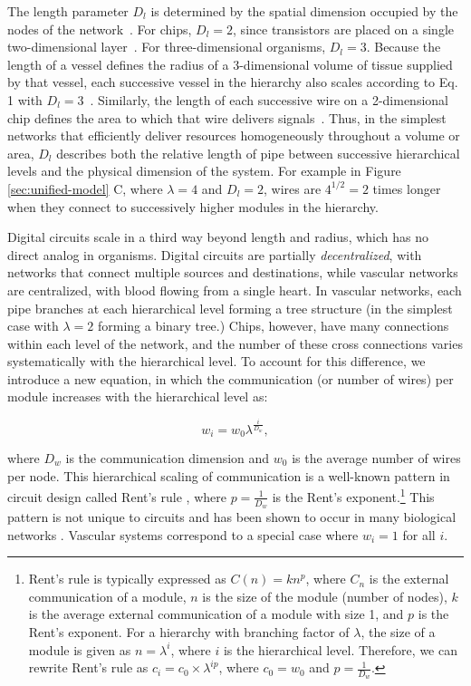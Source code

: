 \documentclass[12pt]{article}
\begin{document}
The length parameter $D_l$ is determined by the spatial dimension occupied by the
nodes of the network~\cite{mandelbrot83}.  For chips, $D_l = 2$, since
transistors are placed on a single two-dimensional layer~\cite{donath81}. For
three-dimensional organisms,  $D_l = 3$. Because the length of a
vessel defines the radius of a 3-dimensional volume of tissue supplied
by that vessel, each successive vessel in the hierarchy also scales
according to Eq. 1 with $D_l = 3$~\cite{west97, banavar10}. Similarly,
the length of each successive wire on a 2-dimensional chip defines the
area to which that wire delivers signals~\cite{moses08}. Thus, in the simplest networks that efficiently deliver resources homogeneously throughout a volume or area, $D_l$ describes both the relative length of pipe between successive hierarchical levels and the physical
dimension of the system. For example in Figure \ref{sec:unified-model} C, where $\lambda = 4$ and $D_l = 2$, wires are $4^{1/2} = 2$ times longer when they connect to successively higher modules in the hierarchy.

Digital circuits scale in a third way beyond length and radius, which
has no direct analog in organisms. Digital circuits are partially \emph{decentralized}, with networks that connect multiple sources and destinations, while vascular networks are
centralized, with blood flowing from a single heart. 
In vascular networks, each pipe
branches at each hierarchical level forming a tree structure
(in the simplest case with $\lambda = 2$ forming
a binary tree.) Chips, however, have many connections within each
level of the network, and the number of these cross connections
varies systematically with the hierarchical level.  
 To account for
this difference, we introduce a new equation, in which the
communication (or number of wires) per module increases with the
hierarchical level as:  

\begin{equation}
  w_i = w_0 \lambda^{\frac{i}{D_w}},
\label{eq:communication}
\end{equation}

\noindent where $D_w$ is the communication dimension and $w_0$ is the average
number of wires per node.  This hierarchical scaling of communication is a
well-known pattern in circuit design called Rent's rule \cite{christie00},
where $p = \frac{1}{D_w}$ is the Rent's exponent.\footnote{Rent's rule is typically
  expressed as $C(n) = kn^p$, where $C_n$ is the external communication of a
  module, $n$ is the size of the module (number of nodes), $k$ is the average
  external communication of a module with size 1, and $p$ is the Rent's
  exponent. For a hierarchy with branching factor of $\lambda$, the size of a
  module is given as $n = \lambda^i$, where $i$ is the hierarchical level.
  Therefore, we can rewrite Rent's rule as $c_i = c_0 \times \lambda^{ip}$,
where $c_0 = w_0$ and $p = \frac{1}{D_w}$.} This pattern is not unique to circuits
and has been shown to occur in many biological networks
\cite{reda09,bassett10,meunier2010modular,solee2013evolutionary}.   Vascular systems correspond to a special case where 
$w_i = 1$ for all $i$. 
\end{document}
